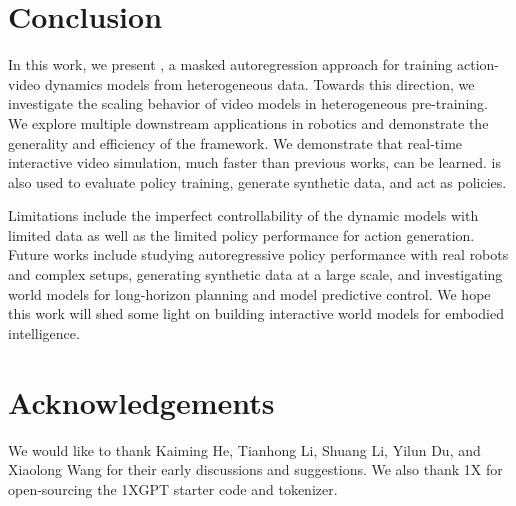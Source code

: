 \section{Conclusion}
\label{sec:conclusion}
In this work, we present \ourshort, a masked autoregression approach for training action-video dynamics models from heterogeneous data. Towards this direction, we investigate the scaling behavior of video models in heterogeneous pre-training. We explore multiple downstream applications in robotics and demonstrate the generality and efficiency of the framework. We demonstrate that real-time interactive video simulation, much faster than previous works, can be learned. \ourshort is also used to evaluate policy training, generate synthetic data, and act as policies.

 
Limitations include the imperfect controllability of the dynamic models with limited data as well as the limited policy performance for action generation. Future works include studying autoregressive policy performance with real robots and complex setups, generating synthetic data at a large scale, and investigating world models for long-horizon planning and model predictive control. We hope this work will shed some light on building interactive world models for embodied intelligence. 

\section{Acknowledgements}
\label{sec:acknowledgement}
We would like to thank Kaiming He, Tianhong Li, Shuang Li, Yilun Du, and Xiaolong Wang  for their early discussions and suggestions. 
We also thank 1X for open-sourcing the 1XGPT starter code and tokenizer.

